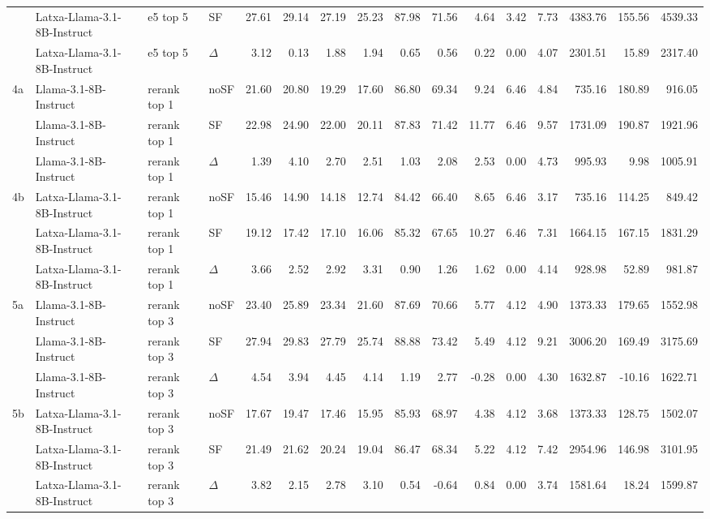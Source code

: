 \begin{landscape}
\begin{footnotesize}
\begin{longtable}{l l l l r r r r r r r r r r r r}
 & Latxa-Llama-3.1-8B-Instruct & e5 top 5 & SF & 27.61 & 29.14 & 27.19 & 25.23 & 87.98 & 71.56 & 4.64 & 3.42 & 7.73 & 4383.76 & 155.56 & 4539.33 \\
 & Latxa-Llama-3.1-8B-Instruct & e5 top 5 & $\Delta$ & 3.12 & 0.13 & 1.88 & 1.94 & 0.65 & 0.56 & 0.22 & 0.00 & 4.07 & 2301.51 & 15.89 & 2317.40 \\
\midrule
4a & Llama-3.1-8B-Instruct & rerank top 1 & noSF & 21.60 & 20.80 & 19.29 & 17.60 & 86.80 & 69.34 & 9.24 & 6.46 & 4.84 & 735.16 & 180.89 & 916.05 \\
 & Llama-3.1-8B-Instruct & rerank top 1 & SF & 22.98 & 24.90 & 22.00 & 20.11 & 87.83 & 71.42 & 11.77 & 6.46 & 9.57 & 1731.09 & 190.87 & 1921.96 \\
 & Llama-3.1-8B-Instruct & rerank top 1 & $\Delta$ & 1.39 & 4.10 & 2.70 & 2.51 & 1.03 & 2.08 & 2.53 & 0.00 & 4.73 & 995.93 & 9.98 & 1005.91 \\
4b & Latxa-Llama-3.1-8B-Instruct & rerank top 1 & noSF & 15.46 & 14.90 & 14.18 & 12.74 & 84.42 & 66.40 & 8.65 & 6.46 & 3.17 & 735.16 & 114.25 & 849.42 \\
 & Latxa-Llama-3.1-8B-Instruct & rerank top 1 & SF & 19.12 & 17.42 & 17.10 & 16.06 & 85.32 & 67.65 & 10.27 & 6.46 & 7.31 & 1664.15 & 167.15 & 1831.29 \\
 & Latxa-Llama-3.1-8B-Instruct & rerank top 1 & $\Delta$ & 3.66 & 2.52 & 2.92 & 3.31 & 0.90 & 1.26 & 1.62 & 0.00 & 4.14 & 928.98 & 52.89 & 981.87 \\
\midrule
5a & Llama-3.1-8B-Instruct & rerank top 3 & noSF & 23.40 & 25.89 & 23.34 & 21.60 & 87.69 & 70.66 & 5.77 & 4.12 & 4.90 & 1373.33 & 179.65 & 1552.98 \\
 & Llama-3.1-8B-Instruct & rerank top 3 & SF & 27.94 & 29.83 & 27.79 & 25.74 & 88.88 & 73.42 & 5.49 & 4.12 & 9.21 & 3006.20 & 169.49 & 3175.69 \\
 & Llama-3.1-8B-Instruct & rerank top 3 & $\Delta$ & 4.54 & 3.94 & 4.45 & 4.14 & 1.19 & 2.77 & -0.28 & 0.00 & 4.30 & 1632.87 & -10.16 & 1622.71 \\
5b & Latxa-Llama-3.1-8B-Instruct & rerank top 3 & noSF & 17.67 & 19.47 & 17.46 & 15.95 & 85.93 & 68.97 & 4.38 & 4.12 & 3.68 & 1373.33 & 128.75 & 1502.07 \\
 & Latxa-Llama-3.1-8B-Instruct & rerank top 3 & SF & 21.49 & 21.62 & 20.24 & 19.04 & 86.47 & 68.34 & 5.22 & 4.12 & 7.42 & 2954.96 & 146.98 & 3101.95 \\
 & Latxa-Llama-3.1-8B-Instruct & rerank top 3 & $\Delta$ & 3.82 & 2.15 & 2.78 & 3.10 & 0.54 & -0.64 & 0.84 & 0.00 & 3.74 & 1581.64 & 18.24 & 1599.87 \\

\end{longtable}
\end{footnotesize}
\end{landscape}
